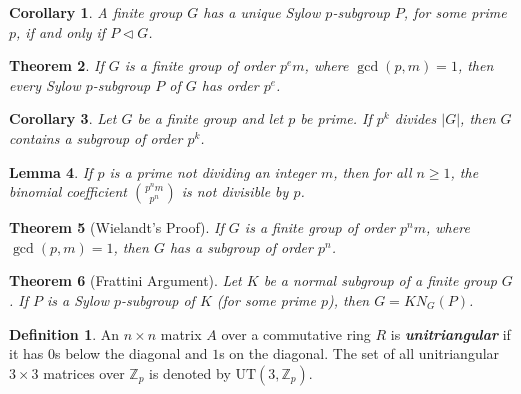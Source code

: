 \documentclass[12pt]{report}
\newtheorem{theorem}{Theorem}[chapter]
\newtheorem{corollary}[theorem]{Corollary}
\newtheorem{lemma}[theorem]{Lemma}
\theoremstyle{definition}
\newtheorem*{definition}{Definition}
\newcommand{\term}[1]{\textbf{\textit{#1}}}
\begin{document}
\begin{corollary}
	A finite group $G$ has a unique Sylow $p$-subgroup $P$, for some prime $p$, if and only if $P\vartriangleleft G$.
\end{corollary}

\begin{theorem}
	If $G$ is a finite group of order $p{^e}m$, where $\gcd(p,m)=1$, then every Sylow $p$-subgroup $P$ of $G$ has order $p^e$.
\end{theorem}

\begin{corollary}
	Let $G$ be a finite group and let $p$ be prime. If $p^k$ divides $|G|$, then $G$ contains a subgroup of order $p^k$.
\end{corollary}

\begin{lemma}
	If $p$ is a prime not dividing an integer $m$, then for all $n\geq 1$, the binomial coefficient $\binom{p{^n}m}{p^n}$ is not divisible by $p$.
\end{lemma}

\begin{theorem}[Wielandt's Proof]
	If $G$ is a finite group of order $p{^n}m$, where $\gcd(p,m)=1$, then $G$ has a subgroup of order $p^n$.
\end{theorem}

\begin{theorem}[Frattini Argument]
	Let $K$ be a normal subgroup of a finite group $G$. If $P$ is a Sylow $p$-subgroup of $K$ (for some prime $p$), then $G=KN_G(P)$.
\end{theorem}

\begin{definition}
	An $n\times n$ matrix $A$ over a commutative ring $R$ is \term{unitriangular} if it has $0$s below the diagonal and $1$s on the diagonal.
	The set of all unitriangular $3\times 3$ matrices over $\mathbb{Z}_p$ is denoted by $\mathrm{UT}(3,\mathbb{Z}_p)$.
\end{definition}
\end{document}
